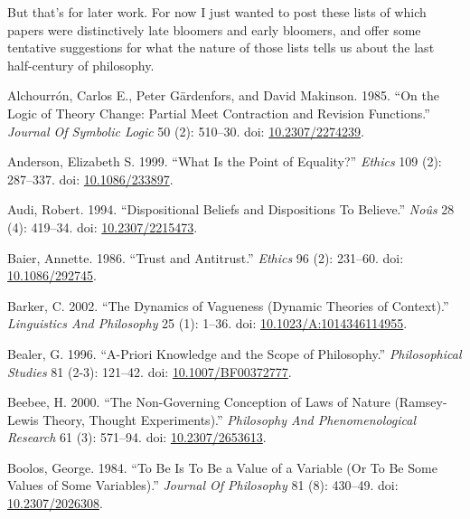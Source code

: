 \documentclass[
  10pt,
  letterpaper,
  DIV=11,
  numbers=noendperiod,
  twoside]{scrartcl}
\newlength{\cslhangindent}
\newenvironment{CSLReferences}[2] %
 {\begin{list}{}{%
  \setlength{\itemindent}{0pt}
  \setlength{\leftmargin}{0pt}
  \setlength{\parsep}{0pt}
  \ifodd #1
   \setlength{\leftmargin}{\cslhangindent}
   \setlength{\itemindent}{-1\cslhangindent}
  \fi
  \setlength{\itemsep}{#2\baselineskip}}}
 {\end{list}}
\begin{document}
But that's for later work. For now I just wanted to post these lists of
which papers were distinctively late bloomers and early bloomers, and
offer some tentative suggestions for what the nature of those lists
tells us about the last half-century of philosophy.

\label{refs}
\begin{CSLReferences}{1}{0}
Alchourrón, Carlos E., Peter Gärdenfors, and David Makinson. 1985. {``On
the Logic of Theory Change: Partial Meet Contraction and Revision
Functions.''} \emph{Journal Of Symbolic Logic} 50 (2): 510--30. doi:
\href{https://doi.org/10.2307/2274239}{10.2307/2274239}.

Anderson, Elizabeth S. 1999. {``What Is the Point of Equality?''}
\emph{Ethics} 109 (2): 287--337. doi:
\href{https://doi.org/10.1086/233897}{10.1086/233897}.

Audi, Robert. 1994. {``Dispositional Beliefs and Dispositions To
Believe.''} \emph{Noûs} 28 (4): 419--34. doi:
\href{https://doi.org/10.2307/2215473}{10.2307/2215473}.

Baier, Annette. 1986. {``Trust and Antitrust.''} \emph{Ethics} 96 (2):
231--60. doi: \href{https://doi.org/10.1086/292745}{10.1086/292745}.

Barker, C. 2002. {``The Dynamics of Vagueness (Dynamic Theories of
Context).''} \emph{Linguistics And Philosophy} 25 (1): 1--36. doi:
\href{https://doi.org/10.1023/A:1014346114955}{10.1023/A:1014346114955}.

Bealer, G. 1996. {``A-Priori Knowledge and the Scope of Philosophy.''}
\emph{Philosophical Studies} 81 (2-3): 121--42. doi:
\href{https://doi.org/10.1007/BF00372777}{10.1007/BF00372777}.

Beebee, H. 2000. {``The Non-Governing Conception of Laws of Nature
(Ramsey-Lewis Theory, Thought Experiments).''} \emph{Philosophy And
Phenomenological Research} 61 (3): 571--94. doi:
\href{https://doi.org/10.2307/2653613}{10.2307/2653613}.

Boolos, George. 1984. {``To Be Is To Be a Value of a Variable (Or To Be
Some Values of Some Variables).''} \emph{Journal Of Philosophy} 81 (8):
430--49. doi: \href{https://doi.org/10.2307/2026308}{10.2307/2026308}.


\end{CSLReferences}
\end{document}

